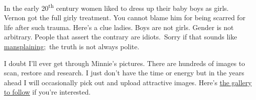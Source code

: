 In the early 20\textsuperscript{th} century women liked to dress up
their baby boys as girls. Vernon got the full girly treatment. You
cannot blame him for being scarred for life after such trauma. Here's a
clue ladies. Boys are not girls. Gender is not arbitrary. People that
assert the contrary are idiots.~Sorry if that sounds like
\href{http://www.policymic.com/articles/44479/mansplaining-101-how-to-discuss-politics-and-feminism-without-acting-like-a-jackass}{mansplaining};~the
truth is not always polite.

I doubt I'll ever get through Minnie's pictures. There are hundreds of
images to scan, restore and research. I just don't have the time or
energy but in the years ahead I will occasionally pick out and upload
attractive images. Here's
\href{http://conceptcontrol.smugmug.com/People/Minnie-Raver}{the gallery
to follow} if you're interested.

%



